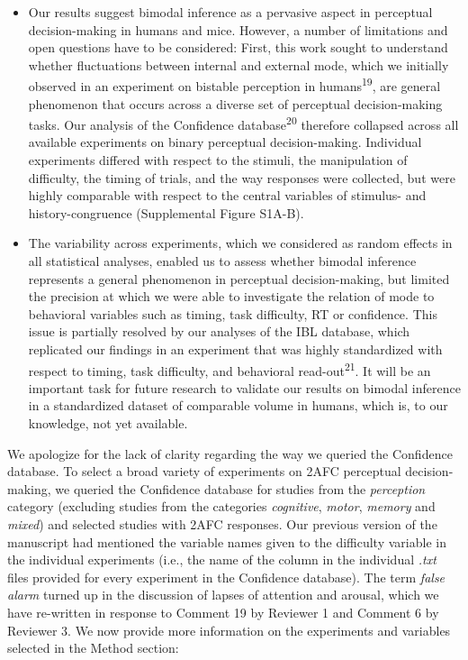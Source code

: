 \documentclass[
]{article}
\begin{document}
\begin{itemize}
\item
  Our results suggest bimodal inference as a pervasive aspect in
  perceptual decision-making in humans and mice. However, a number of
  limitations and open questions have to be considered: First, this work
  sought to understand whether fluctuations between internal and
  external mode, which we initially observed in an experiment on
  bistable perception in humans\textsuperscript{19}, are general
  phenomenon that occurs across a diverse set of perceptual
  decision-making tasks. Our analysis of the Confidence
  database\textsuperscript{20} therefore collapsed across all available
  experiments on binary perceptual decision-making. Individual
  experiments differed with respect to the stimuli, the manipulation of
  difficulty, the timing of trials, and the way responses were
  collected, but were highly comparable with respect to the central
  variables of stimulus- and history-congruence (Supplemental Figure
  S1A-B).
\item
  The variability across experiments, which we considered as random
  effects in all statistical analyses, enabled us to assess whether
  bimodal inference represents a general phenomenon in perceptual
  decision-making, but limited the precision at which we were able to
  investigate the relation of mode to behavioral variables such as
  timing, task difficulty, RT or confidence. This issue is partially
  resolved by our analyses of the IBL database, which replicated our
  findings in an experiment that was highly standardized with respect to
  timing, task difficulty, and behavioral read-out\textsuperscript{21}.
  It will be an important task for future research to validate our
  results on bimodal inference in a standardized dataset of comparable
  volume in humans, which is, to our knowledge, not yet available.
\end{itemize}

We apologize for the lack of clarity regarding the way we queried the
Confidence database. To select a broad variety of experiments on 2AFC
perceptual decision-making, we queried the Confidence database for
studies from the \emph{perception} category (excluding studies from the
categories \emph{cognitive}, \emph{motor}, \emph{memory} and
\emph{mixed}) and selected studies with 2AFC responses. Our previous
version of the manuscript had mentioned the variable names given to the
difficulty variable in the individual experiments (i.e., the name of the
column in the individual \emph{.txt} files provided for every experiment
in the Confidence database). The term \emph{false alarm} turned up in
the discussion of lapses of attention and arousal, which we have
re-written in response to Comment 19 by Reviewer 1 and Comment 6 by
Reviewer 3. We now provide more information on the experiments and
variables selected in the Method section:
\end{document}
